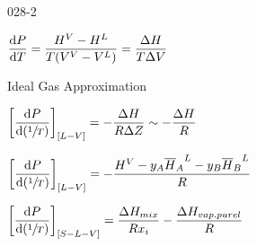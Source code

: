 \begin{mitframe}{028-2}

\begin{listone}

		\item $\dfrac{\mathrm{d}\p}{\mathrm{d}\Temp}=\dfrac{\enthalpy^{\vol}-\enthalpy^{\length}}{\Temp(\vol^{\vol}-\vol^{\length})}=\dfrac{\iipf\enthalpy}{\Temp\iipf\vol}$
	   
		\item Ideal Gas Approximation    	
    
		\item$\bigg[\dfrac{\mathrm{d}\p}{\mathrm{d}(\sfrac{1}{\Temp})}\bigg]_{[\length-\vol]}=-\dfrac{\iipf\enthalpy}{\gasconst\iipf\compress}\sim-\dfrac{\iipf\enthalpy}{\gasconst}$  

    	\begin{listtwo}
    		
            \item$\bigg[\dfrac{\mathrm{d}\p}{\mathrm{d}(\sfrac{1}{\Temp})}\bigg]_{[\length-\vol]}=-\dfrac{\enthalpy^{\vol}-y_{\helmholtz}{\overline{\enthalpy}_{\helmholtz}}^{\length}-y_{\exergy}{\overline{\enthalpy}_{\exergy}}^{\length}}{\gasconst}$

     	\end{listtwo}

		\item$\bigg[\dfrac{\mathrm{d}\p}{\mathrm{d}(\sfrac{1}{\Temp})}\bigg]_{[\entropy-\length-\vol]}=\dfrac{\iipf\enthalpy_{\mixfunc}}{\gasconst\specfrac{i}}-\dfrac{\iipf\enthalpy_{vap. purel}}{\gasconst}$

\end{listone}
    
\end{mitframe}